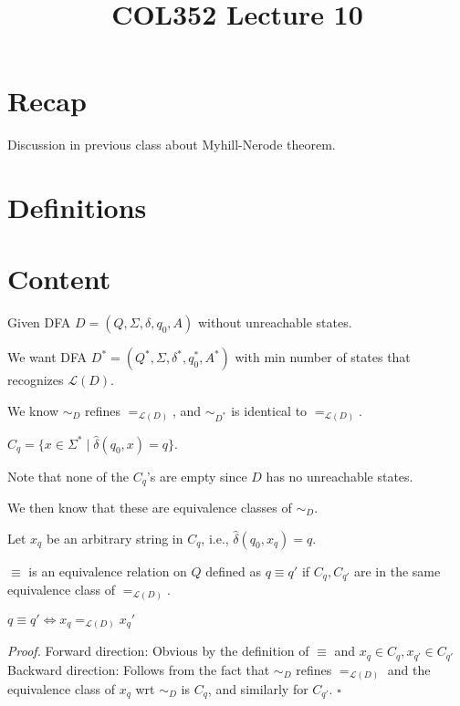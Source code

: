 \documentclass[a4paper]{article}
\title{\textbf{COL352 Lecture 10}}
\date{}
\newenvironment{proof}{\begin{breakbox}\textit{Proof.}}{\hfill$\square$\end{breakbox}}
\newcommand{\nl}{\vspace{0.2cm}\\}
\newcommand{\mc}{\mathcal}
\renewcommand{\L}{\mc{L}}
\newcommand{\hd}{\hat{\delta}}
\begin{document}
\maketitle
\tableofcontents

\section{Recap}

Discussion in previous class about Myhill-Nerode theorem.

\section{Definitions}

\section{Content}

Given DFA $D = (Q, \Sigma, \delta, q_0, A)$ without unreachable states.

We want DFA $D^* = (Q^*, \Sigma, \delta^*, q_0^*, A^*)$ with min number of states that recognizes $\L(D)$.

We know $\sim_D$ refines $=_{\L(D)}$, and $\sim_{D^*}$ is identical to $=_{\L(D)}$.

\begin{defn}
$C_q = \{x \in \Sigma^* \mid \hd(q_0, x) = q\}$.
\end{defn}

Note that none of the $C_q$'s are empty since $D$ has no unreachable states.

We then know that these are equivalence classes of $\sim_D$.

Let $x_q$ be an arbitrary string in $C_q$, i.e., $\hd(q_0, x_q) = q$.

\begin{defn}
    $\equiv$ is an equivalence relation on $Q$ defined as $q \equiv q'$ if $C_q, C_{q'}$ are in the same equivalence class of $=_{\L(D)}$.
\end{defn}

\begin{claim}
    $q \equiv q' \iff x_q =_{\L(D)} x_q'$
\end{claim}

\begin{proof}
    Forward direction: Obvious by the definition of $\equiv$ and $x_q \in C_q, x_{q'} \in C_{q'}$\nl
    Backward direction: Follows from the fact that $\sim_D$ refines $=_{\L(D)}$ and the equivalence class of $x_q$ wrt $\sim_D$ is $C_q$, and similarly for $C_{q'}$.
\end{proof}
\end{document}
